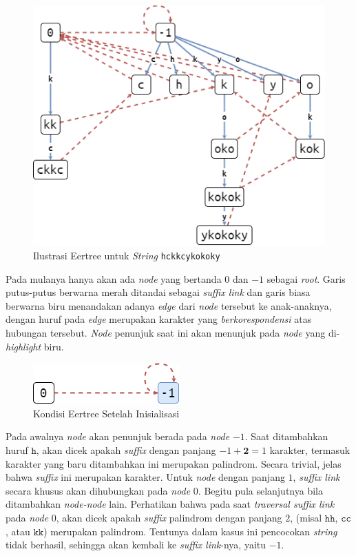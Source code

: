 \documentclass[11pt, a4paper, final]{article}
\begin{document}
\begin{figure}[H]
\centering
\includegraphics[scale=0.4]{assets/eertree.png}
\caption{Ilustrasi Eertree untuk \textit{String} \texttt{hckkcykokoky}}
\end{figure}

Pada mulanya hanya akan ada \textit{node} yang bertanda $0$ dan $-1$ sebagai \textit{root}. Garis putus-putus berwarna merah ditandai sebagai \textit{suffix link} dan garis biasa berwarna biru menandakan adanya \textit{edge} dari \textit{node} tersebut ke anak-anaknya, dengan huruf pada \textit{edge} merupakan karakter yang \textit{berkorespondensi} atas hubungan tersebut. \textit{Node} penunjuk saat ini akan menunjuk pada \textit{node} yang di-\textit{highlight} biru.

\begin{figure}[H]
\centering
\includegraphics[scale=0.4]{assets/eer01.png}
\caption{Kondisi Eertree Setelah Inisialisasi}
\end{figure}

Pada awalnya \textit{node} akan penunjuk berada pada \textit{node} $-1$. Saat ditambahkan huruf $\texttt{h}$, akan dicek apakah \textit{suffix} dengan panjang $-1 + \textbf{2} = 1$ karakter, termasuk karakter yang baru ditambahkan ini merupakan palindrom. Secara trivial, jelas bahwa \textit{suffix} ini merupakan karakter. Untuk \textit{node} dengan panjang $1$, \textit{suffix link} secara khusus akan dihubungkan pada \textit{node} $0$. Begitu pula selanjutnya bila ditambahkan \textit{node-node} lain. Perhatikan bahwa pada saat \textit{traversal suffix link} pada \textit{node} $0$, akan dicek apakah \textit{suffix} palindrom dengan panjang $2$, (misal $\texttt{hh}$, $\texttt{cc}$, atau $\texttt{kk}$) merupakan palindrom. Tentunya dalam kasus ini pencocokan \textit{string} tidak berhasil, sehingga akan kembali ke \textit{suffix link}-nya, yaitu $-1$.
\end{document}
